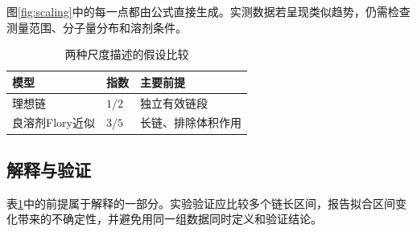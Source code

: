 图\ref{fig:scaling}中的每一点都由公式直接生成。实测数据若呈现类似趋势，仍需检查测量范围、分子量分布和溶剂条件。
\begin{table}[htbp]
  \centering
  \caption{两种尺度描述的假设比较}
  \label{tab:models}
  \begin{tabular}{lll}
    \toprule
    模型 & 指数 & 主要前提\\
    \midrule
    理想链 & $1/2$ & 独立有效链段\\
    良溶剂Flory近似 & $3/5$ & 长链、排除体积作用\\
    \bottomrule
  \end{tabular}
\end{table}

\subsection{解释与验证}
表\ref{tab:models}中的前提属于解释的一部分。实验验证应比较多个链长区间，报告拟合区间变化带来的不确定性，并避免用同一组数据同时定义和验证结论。
